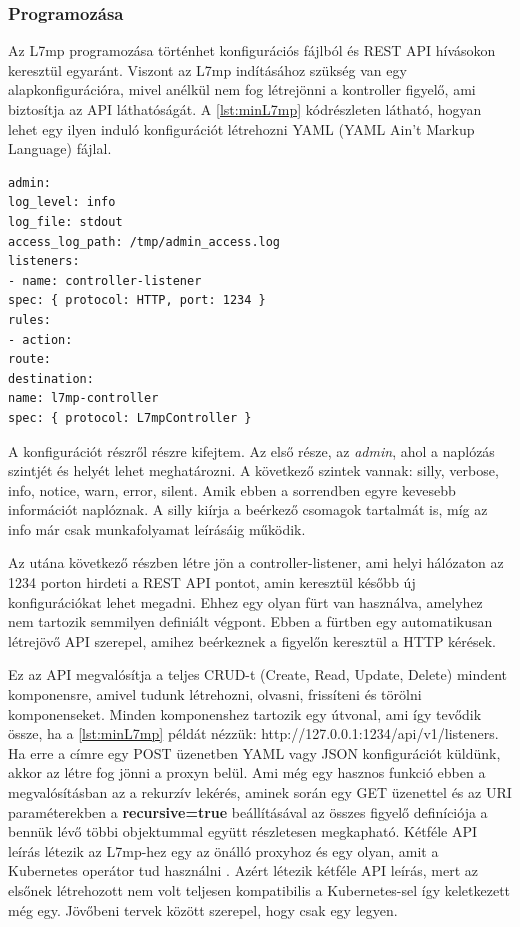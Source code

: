 \subsubsection{Programozása}

Az L7mp programozása történhet konfigurációs fájlból és REST API hívásokon keresztül
egyaránt. Viszont az L7mp indításához szükség van egy alapkonfigurációra, mivel
anélkül nem fog létrejönni a kontroller figyelő, ami biztosítja az API 
láthatóságát. A \ref{lst:minL7mp} kódrészleten látható, hogyan lehet egy ilyen induló konfigurációt
létrehozni YAML (YAML Ain't Markup Language) fájlal.

\begin{lstlisting}[caption=L7mp minimális konfiguráció, label=lst:minL7mp]
admin:
log_level: info
log_file: stdout
access_log_path: /tmp/admin_access.log
listeners:
- name: controller-listener
spec: { protocol: HTTP, port: 1234 }
rules:
- action:
route:
destination:
name: l7mp-controller
spec: { protocol: L7mpController }
\end{lstlisting}

A konfigurációt részről részre kifejtem. Az első része, az \textit{admin}, ahol
a naplózás szintjét és helyét lehet meghatározni. A következő szintek vannak:
silly, verbose, info, notice, warn, error, silent. Amik ebben a sorrendben
egyre kevesebb információt naplóznak. A silly kiírja a beérkező csomagok tartalmát
is, míg az info már csak munkafolyamat leírásáig működik.

Az utána következő részben létre jön a controller-listener, ami helyi hálózaton az 
1234 porton hirdeti a REST API pontot, amin keresztül később új konfigurációkat lehet 
megadni. Ehhez egy olyan fürt van használva, amelyhez nem tartozik semmilyen definiált
végpont. Ebben a fürtben egy automatikusan létrejövő API szerepel, amihez beérkeznek 
a figyelőn keresztül a HTTP kérések. 

Ez az API megvalósítja a teljes CRUD-t (Create, Read, Update, Delete) mindent komponensre, 
amivel tudunk létrehozni, olvasni, frissíteni és törölni komponenseket. Minden komponenshez
tartozik egy útvonal, ami így tevődik össze, ha a \ref{lst:minL7mp} példát nézzük: http://127.0.0.1:1234/api/v1/listeners.
Ha erre a címre egy POST üzenetben YAML vagy 
JSON konfigurációt küldünk, akkor az létre fog jönni a proxyn belül. Ami még egy 
hasznos funkció ebben a megvalósításban az a rekurzív lekérés, aminek során egy GET 
üzenettel és az URI paraméterekben a \textbf{recursive=true} beállításával az összes
figyelő definíciója a bennük lévő többi objektummal együtt részletesen megkapható. Kétféle 
API leírás létezik az L7mp-hez egy az önálló proxyhoz \cite{proxy} és egy olyan, amit a 
Kubernetes operátor tud használni \cite{kubeProxy}. Azért létezik kétféle API leírás,
mert az elsőnek létrehozott nem volt teljesen kompatibilis a Kubernetes-sel így 
keletkezett még egy. Jövőbeni tervek között szerepel, hogy csak egy legyen.

